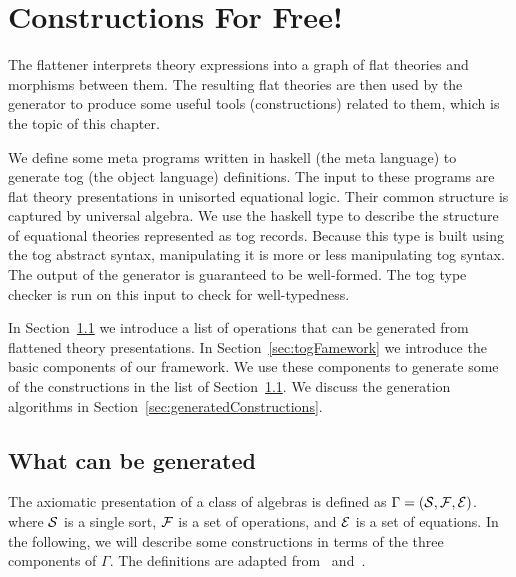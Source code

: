 \chapter{Constructions For Free!}
\label{ch:generation}

The flattener interprets theory expressions into a graph of flat theories and morphisms between them. The resulting flat theories are then used by the generator to produce some useful tools (constructions) related to them, which is the topic of this chapter. 

We define some meta programs written in haskell (the meta language) to generate tog (the object language) definitions. 
The input to these programs are flat theory presentations in unisorted equational logic. Their common structure is captured by universal algebra. We use the haskell type  to describe the structure of equational theories represented as tog records. Because this type is built using the tog abstract syntax, manipulating it is more or less manipulating tog syntax. The output of the generator is guaranteed to be well-formed. The tog type checker is run on this input to check for well-typedness. 

In Section~\ref{sec:toBeGenerated} we introduce a list of operations that can be generated from flattened theory presentations. In Section~\ref{sec:togFamework} we introduce the basic components of our framework. We use these components to generate some of the constructions in the list of Section~\ref{sec:toBeGenerated}. We discuss the generation algorithms in Section~\ref{sec:generatedConstructions}. 

\section{What can be generated}
\label{sec:toBeGenerated}

The axiomatic presentation of a class of algebras is defined as $\Gamma = (\mathcal{S}, \mathcal{F}, \mathcal{E})$.  where $\mathcal{S}$ is a single sort, $\mathcal{F}$ is a set of operations, and $\mathcal{E}$ is a set of equations.  In the following, we will describe some constructions in terms of the three components of $\Gamma$. The definitions are adapted from~\cite{ehrig1985fundamentals} and~\cite{handbook1993Maibaum}.  


